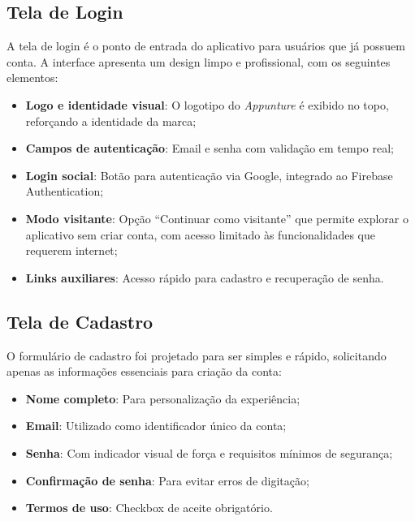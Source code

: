 \subsection{Tela de Login}

A tela de login é o ponto de entrada do aplicativo para usuários que já possuem conta. A interface apresenta um design limpo e profissional, com os seguintes elementos:

\begin{itemize}
    \item \textbf{Logo e identidade visual}: O logotipo do \textit{Appunture} é exibido no topo, reforçando a identidade da marca;
    \item \textbf{Campos de autenticação}: Email e senha com validação em tempo real;
    \item \textbf{Login social}: Botão para autenticação via Google, integrado ao Firebase Authentication;
    \item \textbf{Modo visitante}: Opção ``Continuar como visitante'' que permite explorar o aplicativo sem criar conta, com acesso limitado às funcionalidades que requerem internet;
    \item \textbf{Links auxiliares}: Acesso rápido para cadastro e recuperação de senha.
\end{itemize}


\subsection{Tela de Cadastro}

O formulário de cadastro foi projetado para ser simples e rápido, solicitando apenas as informações essenciais para criação da conta:

\begin{itemize}
    \item \textbf{Nome completo}: Para personalização da experiência;
    \item \textbf{Email}: Utilizado como identificador único da conta;
    \item \textbf{Senha}: Com indicador visual de força e requisitos mínimos de segurança;
    \item \textbf{Confirmação de senha}: Para evitar erros de digitação;
    \item \textbf{Termos de uso}: Checkbox de aceite obrigatório.
\end{itemize}


